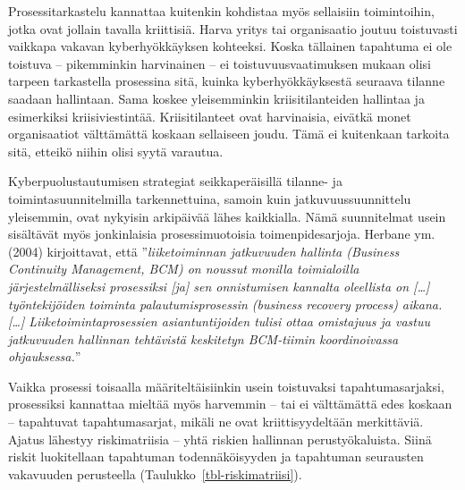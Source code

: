 \documentclass[
  finnish,
  letterpaper,
  DIV=11,
  numbers=noendperiod,
  oneside]{scrreprt}
\begin{document}
Prosessitarkastelu kannattaa kuitenkin kohdistaa myös sellaisiin
toimintoihin, jotka ovat jollain tavalla kriittisiä. Harva yritys tai
organisaatio joutuu toistuvasti vaikkapa vakavan kyberhyökkäyksen
kohteeksi. Koska tällainen tapahtuma ei ole toistuva -- pikemminkin
harvinainen -- ei toistuvuusvaatimuksen mukaan olisi tarpeen tarkastella
prosessina sitä, kuinka kyberhyökkäyksestä seuraava tilanne saadaan
hallintaan. Sama koskee yleisemminkin kriisitilanteiden hallintaa ja
esimerkiksi kriisiviestintää. Kriisitilanteet ovat harvinaisia, eivätkä
monet organisaatiot välttämättä koskaan sellaiseen joudu. Tämä ei
kuitenkaan tarkoita sitä, etteikö niihin olisi syytä varautua.

Kyberpuolustautumisen strategiat seikkaperäisillä tilanne- ja
toimintasuunnitelmilla tarkennettuina, samoin kuin jatkuvuussuunnittelu
yleisemmin, ovat nykyisin arkipäivää lähes kaikkialla. Nämä suunnitelmat
usein sisältävät myös jonkinlaisia prosessimuotoisia toimenpidesarjoja.
Herbane ym. (2004) kirjoittavat, että ''\emph{liiketoiminnan jatkuvuuden
hallinta (Business Continuity Management, BCM) on noussut monilla
toimialoilla järjestelmälliseksi prosessiksi {[}ja{]} sen onnistumisen
kannalta oleellista on {[}\ldots{]} työntekijöiden toiminta
palautumisprosessin (business recovery process) aikana. {[}\ldots{]}
Liiketoimintaprosessien asiantuntijoiden tulisi ottaa omistajuus ja
vastuu jatkuvuuden hallinnan tehtävistä keskitetyn BCM-tiimin
koordinoivassa ohjauksessa.}''

Vaikka prosessi toisaalla määriteltäisiinkin usein toistuvaksi
tapahtumasarjaksi, prosessiksi kannattaa mieltää myös harvemmin -- tai
ei välttämättä edes koskaan -- tapahtuvat tapahtumasarjat, mikäli ne
ovat kriittisyydeltään merkittäviä. Ajatus lähestyy riskimatriisia --
yhtä riskien hallinnan perustyökaluista. Siinä riskit luokitellaan
tapahtuman todennäköisyyden ja tapahtuman seurausten vakavuuden
perusteella (Taulukko~\ref{tbl-riskimatriisi}).
\end{document}
